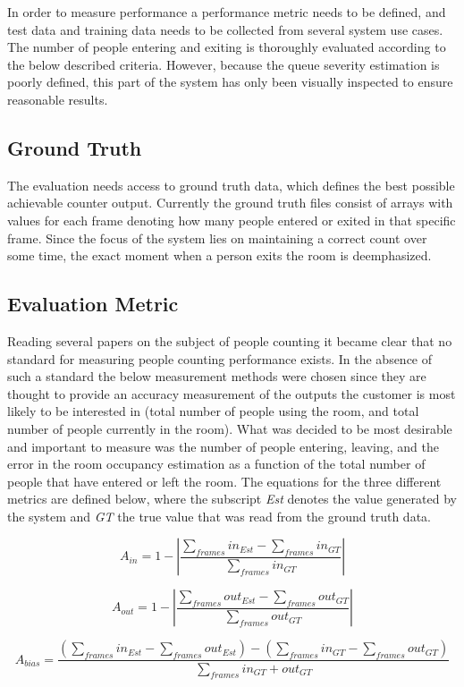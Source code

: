 In order to measure performance a performance metric needs to be defined, and test data and training data needs to be collected from several system use cases. The number of people entering and exiting is thoroughly evaluated according to the below described criteria. However, because the queue severity estimation is poorly defined, this part of the system has only been visually inspected to ensure reasonable results. 

\subsection{Ground Truth}
The evaluation needs access to ground truth data, which defines the best possible achievable counter output. Currently the ground truth files consist of arrays with values for each frame denoting how many people entered or exited in that specific frame. Since the focus of the system lies on maintaining a correct count over some time, the exact moment when a person exits the room is deemphasized.

\subsection{Evaluation Metric}
Reading several papers on the subject of people counting it became clear that no standard for measuring people counting performance exists. In the absence of such a standard the below measurement methods were chosen since they are thought to provide an accuracy measurement of the outputs the customer is most likely to be interested in (total number of people using the room, and total number of people currently in the room).
What was decided to be most desirable and important to measure was the number of people entering, leaving, and the error in the room occupancy estimation as a function of the total number of people that have entered or left the room. The equations for the three different metrics are defined below, where the subscript \textit{Est} denotes the value generated by the system and \textit{GT} the true value that was read from the ground truth data.

\begin{equation}
\label{eq:in_accuracy}
A_{in} = 1 - |\frac{\sum_{frames}{in_{Est}}-\sum_{frames}{in_{GT}}}{\sum_{frames}in_{GT}}|
\end{equation} 

\begin{equation}
\label{eq:out_accuracy}
A_{out} = 1 - |\frac{\sum_{frames}{out_{Est}}-\sum_{frames}out_{GT}}{\sum_{frames}out_{GT}}| 
\end{equation} 

\begin{equation}
\label{eq:occupancy_bias}
A_{bias} = \frac{(\sum_{frames}{in_{Est}-\sum_{frames}out_{Est}})-(\sum_{frames}{in_{GT}-\sum_{frames}out_{GT}})}{\sum_{frames}in_{GT}+out_{GT}} 
\end{equation} 




